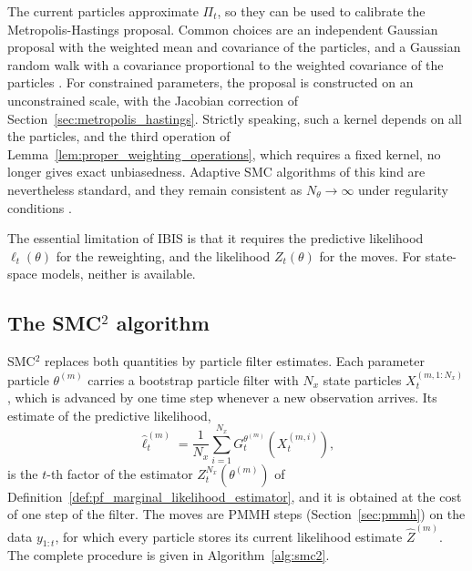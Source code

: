 The current particles approximate $\Pi_t$, so they can be used to calibrate the Metropolis-Hastings proposal. Common choices are an independent Gaussian proposal with the weighted mean and covariance of the particles, and a Gaussian random walk with a covariance proportional to the weighted covariance of the particles \cite{chopin2002sequential,chopin2013smc2}. For constrained parameters, the proposal is constructed on an unconstrained scale, with the Jacobian correction of Section~\ref{sec:metropolis_hastings}. Strictly speaking, such a kernel depends on all the particles, and the third operation of Lemma~\ref{lem:proper_weighting_operations}, which requires a fixed kernel, no longer gives exact unbiasedness. Adaptive SMC algorithms of this kind are nevertheless standard, and they remain consistent as $N_\theta\to\infty$ under regularity conditions \cite{chopin2020smc}.

The essential limitation of IBIS is that it requires the predictive likelihood $\ell_t(\theta)$ for the reweighting, and the likelihood $Z_t(\theta)$ for the moves. For state-space models, neither is available.

\subsection{The SMC\texorpdfstring{$^2$}{2} algorithm}
\label{sec:smc2_algorithm}
SMC$^2$ replaces both quantities by particle filter estimates. Each parameter particle $\theta^{(m)}$ carries a bootstrap particle filter with $N_x$ state particles $X_t^{(m,1:N_x)}$, which is advanced by one time step whenever a new observation arrives. Its estimate of the predictive likelihood,
\begin{equation}
    \hat{\ell}_t^{(m)} = \frac{1}{N_x}\sum_{i=1}^{N_x}G_t^{\theta^{(m)}}(X_t^{(m,i)}),
    \label{eq:smc2_incremental_likelihood}
\end{equation}
is the $t$-th factor of the estimator $Z_t^{N_x}(\theta^{(m)})$ of Definition~\ref{def:pf_marginal_likelihood_estimator}, and it is obtained at the cost of one step of the filter. The moves are PMMH steps (Section~\ref{sec:pmmh}) on the data $y_{1:t}$, for which every particle stores its current likelihood estimate $\hat{Z}^{(m)}$. The complete procedure is given in Algorithm~\ref{alg:smc2}.

